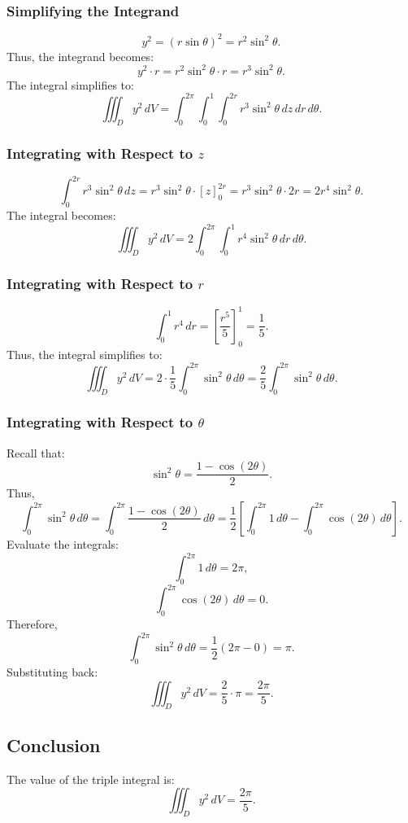 \documentclass[11pt]{article}
\begin{document}
\subsubsection{Simplifying the Integrand}
\[
y^2 = (r\sin\theta)^2 = r^2\sin^2\theta.
\]
Thus, the integrand becomes:
\[
y^2 \cdot r = r^2\sin^2\theta \cdot r = r^3\sin^2\theta.
\]
The integral simplifies to:
\[
\iiint_{D} y^2 \, dV = \int_{0}^{2\pi} \int_{0}^{1} \int_{0}^{2r} r^3\sin^2\theta \, dz \, dr \, d\theta.
\]

\subsubsection{Integrating with Respect to \( z \)}
\[
\int_{0}^{2r} r^3\sin^2\theta \, dz = r^3\sin^2\theta \cdot \left[ z \right]_{0}^{2r} = r^3\sin^2\theta \cdot 2r = 2r^4\sin^2\theta.
\]
The integral becomes:
\[
\iiint_{D} y^2 \, dV = 2 \int_{0}^{2\pi} \int_{0}^{1} r^4\sin^2\theta \, dr \, d\theta.
\]

\subsubsection{Integrating with Respect to \( r \)}
\[
\int_{0}^{1} r^4 \, dr = \left[ \frac{r^5}{5} \right]_{0}^{1} = \frac{1}{5}.
\]
Thus, the integral simplifies to:
\[
\iiint_{D} y^2 \, dV = 2 \cdot \frac{1}{5} \int_{0}^{2\pi} \sin^2\theta \, d\theta = \frac{2}{5} \int_{0}^{2\pi} \sin^2\theta \, d\theta.
\]

\subsubsection{Integrating with Respect to \( \theta \)}
Recall that:
\[
\sin^2\theta = \frac{1 - \cos(2\theta)}{2}.
\]
Thus,
\[
\int_{0}^{2\pi} \sin^2\theta \, d\theta = \int_{0}^{2\pi} \frac{1 - \cos(2\theta)}{2} \, d\theta = \frac{1}{2} \left[ \int_{0}^{2\pi} 1 \, d\theta - \int_{0}^{2\pi} \cos(2\theta) \, d\theta \right].
\]
Evaluate the integrals:
\[
\int_{0}^{2\pi} 1 \, d\theta = 2\pi,
\]
\[
\int_{0}^{2\pi} \cos(2\theta) \, d\theta = 0.
\]
Therefore,
\[
\int_{0}^{2\pi} \sin^2\theta \, d\theta = \frac{1}{2} (2\pi - 0) = \pi.
\]
Substituting back:
\[
\iiint_{D} y^2 \, dV = \frac{2}{5} \cdot \pi = \frac{2\pi}{5}.
\]

\subsection{Conclusion}

The value of the triple integral is:
\[
\iiint_{D} y^2 \, dV = \frac{2\pi}{5}.
\]
\end{document}
